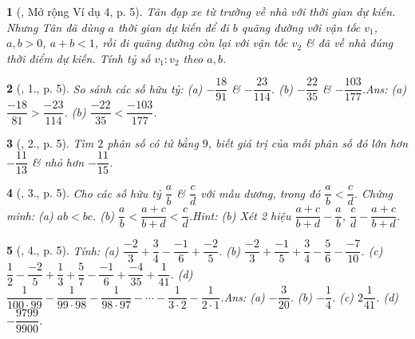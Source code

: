 \documentclass{article}
\newtheorem{baitoan}{}
\begin{document}
\begin{baitoan}[\cite{Binh_Toan_7_tap_1}, Mở rộng Ví dụ 4, p. 5]
	Tân đạp xe từ trường về nhà với thời gian dự kiến. Nhưng Tân đã dùng $a$ thời gian dự kiến để đi $b$ quãng đường với vận tốc $v_1$, $a,b > 0$, $a + b < 1$, rồi đi quãng đường còn lại với vận tốc $v_2$ \& đã về nhà đúng thời điểm dự kiến. Tính tỷ số $v_1:v_2$ theo $a,b$.
\end{baitoan}

\begin{baitoan}[\cite{Binh_Toan_7_tap_1}, 1., p. 5]
	So sánh các số hữu tỷ: (a) $-\dfrac{18}{91}$ \& $-\dfrac{23}{114}$. (b) $-\dfrac{22}{35}$ \& $-\dfrac{103}{177}$.\hfill{\sf Ans: (a) $\dfrac{-18}{81} > \dfrac{-23}{114}$. (b) $\dfrac{-22}{35} < \dfrac{-103}{177}$.}
\end{baitoan}

\begin{baitoan}[\cite{Binh_Toan_7_tap_1}, 2., p. 5]
	Tìm $2$ phân số có tử bằng $9$, biết giá trị của mỗi phân số đó lớn hơn $-\dfrac{11}{13}$ \& nhỏ hơn $-\dfrac{11}{15}$.
\end{baitoan}

\begin{baitoan}[\cite{Binh_Toan_7_tap_1}, 3., p. 5]
	Cho các số hữu tỷ $\dfrac{a}{b}$ \& $\dfrac{c}{d}$ với mẫu dương, trong đó $\dfrac{a}{b} < \dfrac{c}{d}$. Chứng minh: (a) $ab < bc$. (b) $\dfrac{a}{b} < \dfrac{a + c}{b + d} < \dfrac{c}{d}$.\hfill{\sf Hint: (b) Xét 2 hiệu $\dfrac{a + c}{b + d} - \dfrac{a}{b}$, $\dfrac{c}{d} - \dfrac{a + c}{b + d}$.}
\end{baitoan}

\begin{baitoan}[\cite{Binh_Toan_7_tap_1}, 4., p. 5]
	Tính: (a) $\dfrac{-2}{3} + \dfrac{3}{4} - \dfrac{-1}{6} + \dfrac{-2}{5}$. (b) $\dfrac{-2}{3} + \dfrac{-1}{5} + \dfrac{3}{4} - \dfrac{5}{6} - \dfrac{-7}{10}$. (c) $\dfrac{1}{2} - \dfrac{-2}{5} + \dfrac{1}{3} + \dfrac{5}{7} - \dfrac{-1}{6} + \dfrac{-4}{35} + \dfrac{1}{41}$. (d) $\dfrac{1}{100\cdot 99} - \dfrac{1}{99\cdot 98} - \dfrac{1}{98\cdot 97} - \cdots - \dfrac{1}{3\cdot 2} - \dfrac{1}{2\cdot 1}$.\hfill{\sf Ans: (a) $-\dfrac{3}{20}$. (b) $-\dfrac{1}{4}$. (c) $2\dfrac{1}{41}$. (d) $-\dfrac{9799}{9900}$.}
\end{baitoan}
\end{document}
